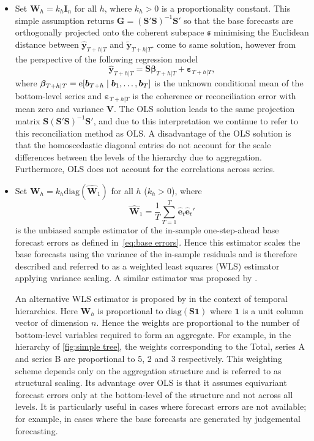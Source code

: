 \documentclass[graybox]{svmult}
\begin{document}
\begin{itemize}\parskip=1.2ex
	\item Set $\bm{W}_{h}=k_h\bm{I}_n$ for all $h$, where $k_{h} > 0$ is a proportionality constant. This simple assumption returns $\bm{G}=(\bm{S}'\bm{S})^{-1}\bm{S}'$ so that the base forecasts are orthogonally projected onto the coherent subspace $\mathfrak{s}$ minimising the Euclidean distance between $\hat{\bm{y}}_{T+h|T}$ and $\tilde{\bm{y}}_{T+h|T}$. \citet{HynEtAl2011} come to same solution, however from the perspective of the following regression model
  \begin{equation*}
    \hat{\bm{y}}_{T+h|T} = \bm{S}\bm{\beta}_{T+h|T} + \bm{\varepsilon}_{T+h|T},
  \end{equation*}
  where $\bm{\beta}_{T+h|T}=\mathrm{e}[\bm{b}_{T+h}\mid\bm{b}_1,\dots,\bm{b}_T]$ is the unknown conditional mean of the bottom-level series and $\bm{\varepsilon}_{T+h|T}$ is the coherence or reconciliation error with mean zero and variance $\bm{V}$. The OLS solution leads to the same projection matrix $\bm{S}(\bm{S}'\bm{S})^{-1}\bm{S}'$, and due to this interpretation we continue to refer to this reconciliation method as OLS\@. A disadvantage of the OLS solution is that the homoscedastic diagonal entries do not account for the scale differences between the levels of the hierarchy due to aggregation. Furthermore, OLS does not account for the correlations across series.

	\item Set ${\bm{W}}_{h}=k_{h}\text{diag}(\hat{\bm{W}}_{1})$ for all $h$ ($k_{h} > 0$), where
  $$
    \hat{\bm{W}}_{1} = \frac{1}{T}\sum_{T=1}^{T} \hat{\bm{e}}_{t}\hat{\bm{e}}_{t}'
  $$
  is the unbiased sample estimator of the in-sample one-step-ahead base forecast errors as defined in~\eqref{eq:base errors}. Hence this estimator scales the base forecasts using the variance of the in-sample residuals and is therefore described and referred to as a weighted least squares (WLS) estimator applying variance scaling. A similar estimator was proposed by \citet{Hyndman2016}.

  An alternative WLS estimator is proposed by \citet{AthEtAl2017} in the context of temporal hierarchies. Here $\bm{W}_{h}$ is proportional to $\text{diag}(\bm{S}\bm{1})$ where $\bm{1}$ is a unit column vector of dimension $n$. Hence the weights are proportional to the number of bottom-level variables required to form an aggregate. For example, in the hierarchy of \autoref{fig:simple tree}, the weights corresponding to the Total, series A and series B are proportional to 5, 2 and 3 respectively. This weighting scheme depends only on the aggregation structure and is referred to as structural scaling. Its advantage over OLS is that it assumes equivariant forecast errors only at the bottom-level of the structure and not across all levels. It is particularly useful in cases where forecast errors are not available; for example, in cases where the base forecasts are generated by judgemental forecasting.


\end{itemize}
\end{document}
